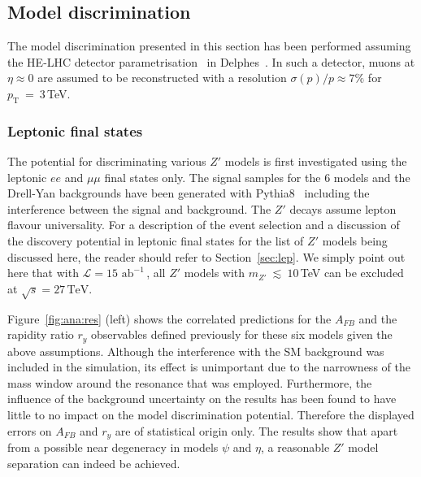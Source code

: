 \documentclass[a4paper,11pt]{article}
\newcommand{\pt}{\ensuremath{p_{\text{T}}}}
\newcommand*{\intlumihelhc}{\ensuremath{\mathcal{L}=15\,\text{ab}^{-1}}}
\newcommand*{\sqrtshelhc}{\ensuremath{\sqrt{s}=27\,\text{TeV}}}
\renewcommand*{\intlumihelhc}{\ensuremath{\mathcal{L}=15\text{ ab}^{-1}}}
\newcommand{\py}{{\sc Pythia8}}
\newcommand{\delphes}{{\sc Delphes}}
\begin{document}
\subsection{Model discrimination}

The model discrimination presented in this section has been performed assuming the HE-LHC detector parametrisation~\cite{hlhelhc_web} in \delphes~\cite{deFavereau:2013fsa}. In such a detector, muons at $\eta \approx 0$ are assumed to be reconstructed with a resolution $\sigma(p)/p \approx 7\%$ for $\pt~=~3$\,TeV.

\subsubsection{Leptonic final states}
\label{par:lepana}

The potential for discriminating various $Z'$ models is first investigated using the leptonic $ee$ and $\mu\mu$ final states only. The signal samples for the 6 models and the Drell-Yan backgrounds have been generated with \py~\cite{Sjostrand:2014zea} including the interference between the signal and background. The $Z'$ decays assume lepton flavour universality. For a description of the event selection and a discussion of the discovery potential in leptonic final states for the list of $Z'$ models being discussed here, the reader should refer to Section~\ref{sec:lep}. We simply point out here that with \intlumihelhc\,, all $Z'$ models with $m_{Z'}~\lesssim~10$\,TeV can be excluded at \sqrtshelhc.

Figure~\ref{fig:ana:res} (left) shows the correlated predictions for the $A_{FB}$ and the rapidity ratio $r_y$ observables defined previously for these six models given the above assumptions. Although the interference with the SM background was included in the simulation, its effect is unimportant due to the narrowness of the mass window around the resonance that was employed. Furthermore, the influence of the background uncertainty on the results has been found to have little to no impact on the model discrimination potential. Therefore the displayed errors on $A_{FB}$ and $r_y$ are of statistical origin only. The results show that apart from a possible near degeneracy in models $\psi$ and $\eta$, a reasonable $Z'$ model separation can indeed be achieved.
\end{document}
